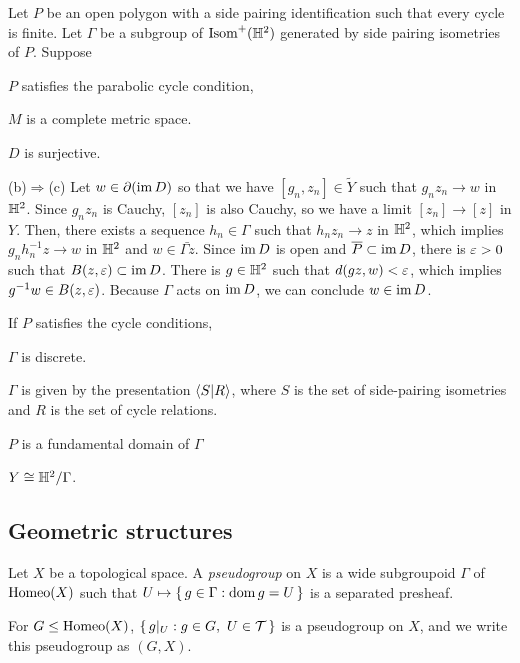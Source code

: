 \documentclass[a4paper]{article}
\begin{document}
\begin{prb}
Let $P$ be an open polygon with a side pairing identification such that every cycle is finite.
Let $\Gamma$ be a subgroup of $\operatorname{Isom}^+(\mathbb{H}^2)$ generated by side pairing isometries of $P$.
Suppose 
\begin{parts}
\item $P$ satisfies the parabolic cycle condition,
\item $M$ is a complete metric space.
\item $D$ is surjective.
\end{parts}
\end{prb}
\begin{pf}
(b)$\Rightarrow$(c)
Let $w\in\partial(\operatorname{im} D)$ so that we have $[g_n,z_n]\in\tilde Y$ such that $g_nz_n\to w$ in $\mathbb{H}^2$.
Since $g_nz_n$ is Cauchy, $[z_n]$ is also Cauchy, so we have a limit $[z_n]\to[z]$ in $Y$.
Then, there exists a sequence $h_n\in\Gamma$ such that $h_nz_n\to z$ in $\mathbb{H}^2$, which implies $g_nh_n^{-1}z\to w$ in $\mathbb{H}^2$ and $w\in\bar{\Gamma z}$.
Since $\operatorname{im} D$ is open and $\overline P\subset\operatorname{im} D$, there is $\varepsilon>0$ such that $B(z,\varepsilon)\subset\operatorname{im} D$.
There is $g\in\mathbb{H}^2$ such that $d(gz,w)<\varepsilon$, which implies $g^{-1}w\in B(z,\varepsilon)$.
Because $\Gamma$ acts on $\operatorname{im} D$, we can conclude $w\in\operatorname{im} D$.
\end{pf}

If $P$ satisfies the cycle conditions,
\begin{parts}
\item $\Gamma$ is discrete.
\item $\Gamma$ is given by the presentation $\langle S|R\rangle$, where $S$ is the set of side-pairing isometries and $R$ is the set of cycle relations.
\item $P$ is a fundamental domain of $\Gamma$
\item $Y\cong\mathbb{H}^2/\Gamma$.
\end{parts}



\subsection{Geometric structures}




\begin{prb}[Pseudogroup]
Let $X$ be a topological space.
A \emph{pseudogroup} on $X$ is a wide subgroupoid $\Gamma$ of $\operatorname{Homeo}(X)$ such that $U\mapsto\{\,g\in\Gamma:\operatorname{dom} g=U\,\}$ is a separated presheaf.
\begin{parts}
\item For $G\le\operatorname{Homeo}(X)$, $\{\,g|_U:g\in G,\ U\in\mathcal{T}\,\}$ is a pseudogroup on $X$, and we write this pseudogroup as $(G,X)$.
\end{parts}
\end{prb}
\end{document}
